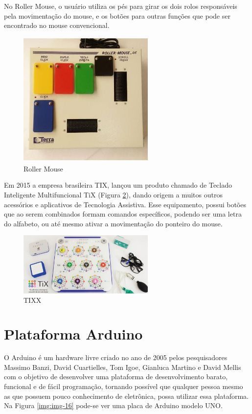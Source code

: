 \documentclass[
	12pt,			%
	openright,		%
	oneside,			%
	a4paper,			%
	chapter=TITLE,		%
	english,			%
	brazil,			%
	]{abntex2}
\begin{document}
No Roller Mouse, o usuário utiliza os pés para girar os dois rolos responsáveis pela movimentação do mouse, e os botões para outras funções que pode ser encontrado no mouse convencional.

\begin{figure}[H]
	\centering
		\includegraphics[width=0.6\textwidth]{./img/img-9.jpg}
		\caption{Roller Mouse}
		\label{img:img-9}
\end{figure}

Em 2015 a empresa brasileira TIX, lançou um produto chamado de Teclado Inteligente Multifuncional TiX (Figura \ref{img:img-14}), dando origem a muitos outros acessórios e aplicativos de Tecnologia Assistiva. Esse equipamento, possui botões que ao serem combinados formam comandos específicos, podendo ser uma letra do alfabeto, ou até mesmo ativar a movimentação do ponteiro do mouse.

\begin{figure}[H]
	\centering
		\includegraphics[width=0.6\textwidth]{./img/img-14.png}
		\caption{TIXX}
		\label{img:img-14}
\end{figure}

\section{Plataforma Arduino}

O Arduino é um hardware livre criado no ano de 2005 pelos pesquisadores Massimo Banzi, David Cuartielles, Tom Igoe, Gianluca Martino e David Mellis com o objetivo de desenvolver uma plataforma de desenvolvimento barato, funcional e de fácil programação, tornando possível que qualquer pessoa mesmo as que possuem pouco conhecimento de eletrônica, possa utilizar essa plataforma. Na Figura \ref{img:img-16} pode-se ver uma placa de Arduino modelo UNO.
\end{document}
